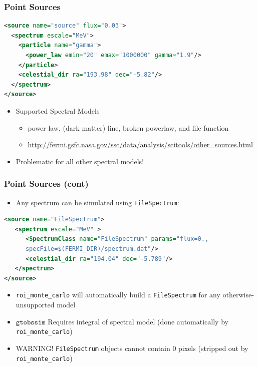 \documentclass[12pt]{beamer}
\newcommand{\gtobssim}{\ensuremath{\mathtt{gtobssim}}\xspace}
\newcommand{\roimc}{\texttt{roi\_monte\_carlo}\xspace}
\begin{document}
\begin{frame}[fragile]
  \frametitle{Point Sources}

  \begin{lstlisting}[language=XML]
<source name="source" flux="0.03">
  <spectrum escale="MeV">
    <particle name="gamma">
      <power_law emin="20" emax="1000000" gamma="1.9"/>
    </particle>
    <celestial_dir ra="193.98" dec="-5.82"/>
  </spectrum>
</source>
  \end{lstlisting}

  \begin{itemize}
    \item Supported Spectral Models
  \begin{itemize}
    \item power law, (dark matter) line, broken powerlaw, and file function
    \item \url{http://fermi.gsfc.nasa.gov/ssc/data/analysis/scitools/other_sources.html}
  \end{itemize}
\item Problematic for all other spectral models!
  \end{itemize}
\end{frame}

\begin{frame}[fragile]
  \frametitle{Point Sources (cont)}
  \begin{itemize}
    \item Any spectrum can be simulated using \texttt{FileSpectrum}:
  \end{itemize}

  \begin{lstlisting}[language=XML]
<source name="FileSpectrum">
   <spectrum escale="MeV" >
      <SpectrumClass name="FileSpectrum" params="flux=0.,
      specFile=$(FERMI_DIR)/spectrum.dat"/>
      <celestial_dir ra="194.04" dec="-5.789"/>
   </spectrum>
</source>
  \end{lstlisting}

  \begin{itemize}
    \item \roimc will automatically build a \texttt{FileSpectrum} for any otherwise-unsupported
      model
    \item \gtobssim Requires integral of spectral model (done automatically by \roimc)
    \item WARNING! \texttt{FileSpectrum} objects cannot contain 0 pixels (stripped out by \roimc)
  \end{itemize}
\end{frame}
\end{document}
